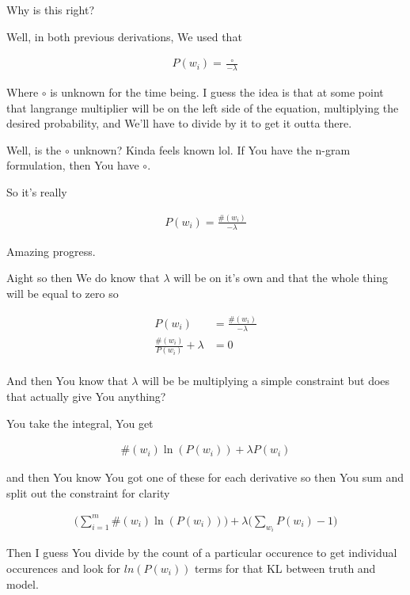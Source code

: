 \documentclass{article}
\begin{document}
		Why is this right?
		
		Well, in both previous derivations, We used that
		
		\begin{align}
			P(w_i) = \frac{\circ}{-\lambda}
		\end{align}
		
		Where $\circ$ is unknown for the time being. I guess the idea is that at some point that langrange multiplier will be on the left side of the equation, multiplying the desired probability, and We'll have to divide by it to get it outta there. 
		
		Well, is the $\circ$ unknown? Kinda feels known lol. If You have the n-gram formulation, then You have $\circ$.
		
		So it's really 
	
	 	\begin{align}
			P(w_i) = \frac{\#(w_i)}{-\lambda}
		\end{align}
		
		Amazing progress.
		
		Aight so then We do know that $\lambda$ will be on it's own and that the whole thing will be equal to zero so
		
		\begin{align}
			P(w_i) &= \frac{\#(w_i)}{-\lambda}\\
			\frac{\#(w_i)}{P(w_i)} + \lambda &= 0\\
		\end{align}
		
		And then You know that $\lambda$ will be be multiplying a simple constraint but does that actually give You anything?
		
		You take the integral, You get 
		
		\begin{align}
			\#(w_i)\ln(P(w_i)) + \lambda P(w_i)
		\end{align}
		
		and then You know You got one of these for each derivative so then You sum and split out the constraint for clarity
		
		\begin{align}
			\bigg(\sum^m_{i=1} \#(w_i)\ln(P(w_i)) \bigg) + \lambda\bigg(\sum_{w_i} P(w_i)-1\bigg)
		\end{align}
		
		Then I guess You divide by the count of a particular occurence to get individual occurences and look for $ln(P(w_i))$ terms for that KL between truth and model.
		
\end{document}
